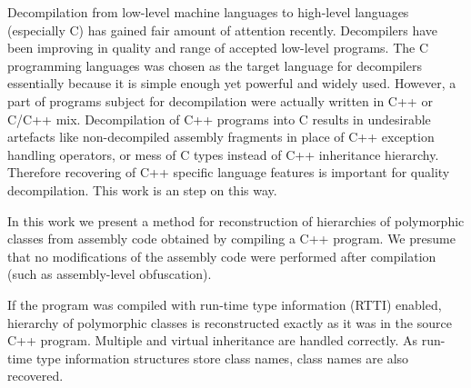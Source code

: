\documentclass[times, 10pt,twocolumn]{article}
\begin{document}
Decompilation from low-level machine languages to high-level
languages (especially C) has gained fair amount of attention
recently. Decompilers have been improving in quality and range
of accepted low-level programs. The C programming languages
was chosen as the target language for decompilers essentially
because it is simple enough yet powerful and widely used.
However, a part of programs subject for decompilation were
actually written in C++ or C/C++ mix. Decompilation of C++
programs into C results in undesirable artefacts like
non-decompiled assembly fragments in place of C++ exception
handling operators, or mess of C types instead of C++
inheritance hierarchy. Therefore recovering of C++ specific
language features is important for quality decompilation.
This work is an step on this way.



In this work we present a method for reconstruction of
hierarchies of polymorphic classes from assembly code obtained
by compiling a C++ program. We presume that no modifications of
the assembly code were performed after compilation (such as
assembly-level obfuscation).

If the program was compiled with run-time type information
(RTTI) enabled, hierarchy of polymorphic classes is
reconstructed
exactly as it was in the source C++ program. Multiple and
virtual inheritance are handled correctly. As run-time type
information structures store class names, class names are also
recovered.
\end{document}
